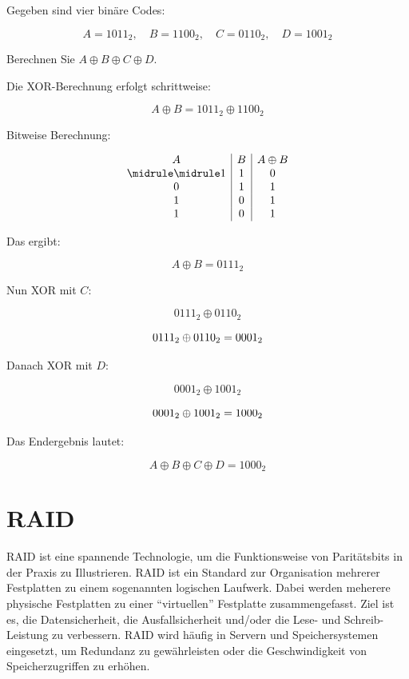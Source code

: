 \begin{myexercise}
Gegeben sind vier binäre Codes:

\[
A = 1011_2, \quad B = 1100_2, \quad C = 0110_2, \quad D = 1001_2
\]

Berechnen Sie \( A \oplus B \oplus C \oplus D \).

\begin{myanswer}
Die XOR-Berechnung erfolgt schrittweise:

\[
A \oplus B = 1011_2 \oplus 1100_2
\]

Bitweise Berechnung:

\[
\begin{array}{c|c|c}
A & B & A \oplus B \\\midrule\midrule
1 & 1 & 0 \\
0 & 1 & 1 \\
1 & 0 & 1 \\
1 & 0 & 1 \\
\end{array}
\]

Das ergibt:

\[
A \oplus B = 0111_2
\]

Nun XOR mit \( C \):

\[
0111_2 \oplus 0110_2
\]

\[
0111_2 \oplus 0110_2 = 0001_2 \\
\]

Danach XOR mit \( D \):

\[
0001_2 \oplus 1001_2
\]

\[
0001_2 \oplus  1001_2 = 1000_2 \\
\]

Das Endergebnis lautet:

\[
A \oplus B \oplus C \oplus D = 1000_2
\]

\end{myanswer}
\end{myexercise}


\section{RAID}

\gls{RAID} ist eine spannende Technologie, um die Funktionsweise von Paritätsbits in der Praxis zu Illustrieren. \gls{RAID} ist ein Standard zur Organisation mehrerer Festplatten zu einem sogenannten logischen Laufwerk. Dabei werden meherere physische Festplatten zu einer ``virtuellen'' Festplatte zusammengefasst. Ziel ist es, die Datensicherheit, die Ausfallsicherheit und/oder die Lese- und Schreib-Leistung zu verbessern. RAID wird häufig in Servern und Speichersystemen eingesetzt, um Redundanz zu gewährleisten oder die Geschwindigkeit von Speicherzugriffen zu erhöhen.

